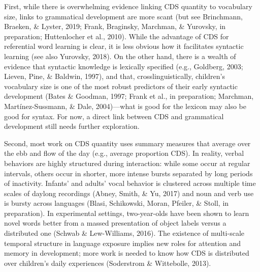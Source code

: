 \documentclass[floatsintext,man]{apa6}
\theoremstyle{definition}
\theoremstyle{definition}
\theoremstyle{definition}
\theoremstyle{remark}
\begin{document}
First, while there is overwhelming evidence linking CDS quantity to
vocabulary size, links to grammatical development are more scant (but
see Brinchmann, Braeken, \& Lyster, 2019; Frank, Braginsky, Marchman, \&
Yurovsky, in preparation; Huttenlocher et al., 2010). While the
advantage of CDS for referential word learning is clear, it is less
obvious how it facilitates syntactic learning (see also Yurovsky, 2018).
On the other hand, there is a wealth of evidence that syntactic
knowledge is lexically specified (e.g., Goldberg, 2003; Lieven, Pine, \&
Baldwin, 1997), and that, crosslinguistically, children's vocabulary
size is one of the most robust predictors of their early syntactic
development (Bates \& Goodman, 1997; Frank et al., in preparation;
Marchman, Martínez-Sussmann, \& Dale, 2004)---what is good for the
lexicon may also be good for syntax. For now, a direct link between CDS
and grammatical development still needs further exploration.

Second, most work on CDS quantity uses summary measures that average
over the ebb and flow of the day (e.g., average proportion CDS). In
reality, verbal behaviors are highly structured during interaction:
while some occur at regular intervals, others occur in shorter, more
intense bursts separated by long periods of inactivity. Infants' and
adults' vocal behavior is clustered across multiple time scales of
daylong recordings (Abney, Smith, \& Yu, 2017) and noun and verb use is
bursty across languages (Blasi, Schikowski, Moran, Pfeiler, \& Stoll, in
preparation). In experimental settings, two-year-olds have been shown to
learn novel words better from a massed presentation of object labels
versus a distributed one (Schwab \& Lew-Williams, 2016). The existence
of multi-scale temporal structure in language exposure implies new roles
for attention and memory in development; more work is needed to know how
CDS is distributed over children's daily experiences (Soderstrom \&
Wittebolle, 2013).
\end{document}
